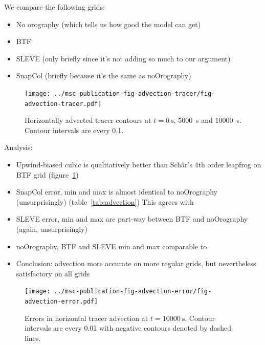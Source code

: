 \documentclass[twocol]{ametsoc}
\begin{document}
We compare the following grids:
\begin{itemize}
	\item No orography (which tells us how good the model can get)
	\item BTF
	\item SLEVE (only briefly since it's not adding so much to our argument)
	\item SnapCol (briefly because it's the same as noOrography)
\end{itemize}


\begin{figure}
	\centering
	\texttt{[image: ../msc-publication-fig-advection-tracer/fig-advection-tracer.pdf]}
%
	\caption{Horizontally advected tracer contours at $t = \SI{0}{\second}$, \SI{5000}{\second} and \SI{10000}{\second}.    Contour intervals are every 0.1.}
	\label{fig:advection-tracer}
\end{figure}

Analysis:
\begin{itemize}
	\item Upwind-biased cubic is qualitatively better than Sch\"ar's 4th order leapfrog on BTF grid (figure~\ref{fig:advection-tracer})
	\item SnapCol error, min and max is almost identical to noOrography (unsurprisingly) (table~\ref{tab:advection})  This agrees with \citet{good2014}
	\item SLEVE error, min and max are part-way between BTF and noOrography (again, unsurprisingly)
	\item noOrography, BTF and SLEVE min and max comparable to \citet{schaer2002}
	\item Conclusion: advection more accurate on more regular grids, but nevertheless satisfactory on all grids
\end{itemize}


\begin{figure}
	\centering
	\texttt{[image: ../msc-publication-fig-advection-error/fig-advection-error.pdf]}
	\caption{Errors in horizontal tracer advection at $t = \SI{10000}{\second}$.    Contour intervals are every 0.01 with negative contours denoted by dashed lines.}
	\label{fig:advection-error}
\end{figure}
\end{document}
